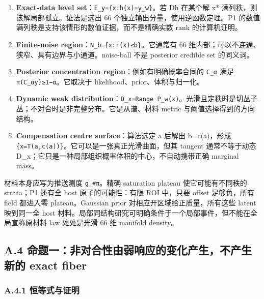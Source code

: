 \documentclass[
  11pt,
  a4paper,
]{article}
\providecommand{\tightlist}{%
  \setlength{\itemsep}{0pt}\setlength{\parskip}{0pt}}
\begin{document}
\begin{enumerate}
\def\labelenumi{\arabic{enumi}.}
\tightlist
\item
  \textbf{Exact-data level set}：\texttt{E\_\allowbreak{}y=\{x:h(x)=y\_\allowbreak{}w\}}。若 Dh
  在某个解 x* 满列秩，则该解局部孤立。证法是选出 66
  个独立输出分量，使用逆函数定理。P1
  的数值满列秩是支持该情形的数值证据，而不是精确实数 rank 的计算机证明。
\item
  \textbf{Finite-noise
  region}：\texttt{N\_\allowbreak{}b=\{x:\textbar{}\textbar{}r(x)\textbar{}\textbar{}≤b\}}。它通常有
  66 维内部；可以不连通、狭窄、具有边界与小通道。noise-ball 不是
  posterior credible set 的同义词。
\item
  \textbf{Posterior concentration region}：例如有明确概率合同的
  \texttt{C\_\allowbreak{}α} 满足 \texttt{π(C\_\allowbreak{}α\textbar{}y)≥1−α}。它取决于
  likelihood、prior、体积与归一化。
\item
  \textbf{Dynamic weak
  distribution}：\texttt{D\_\allowbreak{}x=Range\ P\_\allowbreak{}w(x)}。光滑且定秩时是切丛子丛；不对合时是非完整分布。它是从谱、材料
  metric 与阈值选择得到的方向结构。
\item
  \textbf{Compensation centre surface}：算法选定 a 后解出 b=c(a)，形成
  \texttt{\{x=T(a,c(a))\}}。它可以是一张真正光滑曲面，但其 tangent
  通常不等于动态 D\_\allowbreak{}x；它只是一种局部组织概率体积的中心，不自动携带正确
  marginal mass。
\end{enumerate}

材料本身应写为推送测度 \texttt{g\_\allowbreak{}\#π}。精确 saturation plateau
使它可能有不同秩的 strata；P1 还有全 host 原子的可能性：有限 ROI
中，只要 offset 足够负，所有 field 都进入零 plateau。Gaussian prior
对相应开区域给正质量，所有这些 latent 映到同一全 host
材料。局部同结构研究可明确条件于一个局部事件，但不能在全局宣称原材料 law
处处是光滑 66 维 manifold density。

\hypertarget{a.4-ux547dux9898ux4e00ux975eux5bf9ux5408ux6027ux7531ux5f31ux54cdux5e94ux7684ux53d8ux5316ux4ea7ux751fux4e0dux4ea7ux751fux65b0ux7684-exact-fiber}{%
\subsection{A.4 命题一：非对合性由弱响应的变化产生，不产生新的 exact
fiber}\label{a.4-ux547dux9898ux4e00ux975eux5bf9ux5408ux6027ux7531ux5f31ux54cdux5e94ux7684ux53d8ux5316ux4ea7ux751fux4e0dux4ea7ux751fux65b0ux7684-exact-fiber}}

\hypertarget{a.4.1-ux6052ux7b49ux5f0fux4e0eux8bc1ux660e}{%
\subsubsection{A.4.1
恒等式与证明}\label{a.4.1-ux6052ux7b49ux5f0fux4e0eux8bc1ux660e}}
\end{document}
